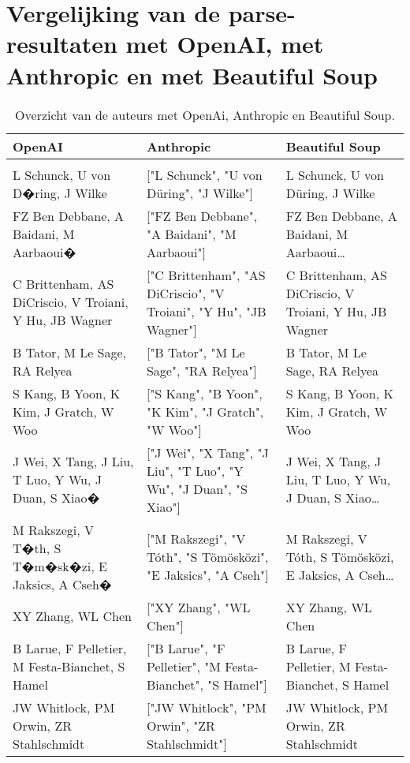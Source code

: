 \section{Vergelijking van de parse-resultaten met OpenAI, met Anthropic en met Beautiful Soup}
\begin{table}[h!]
    \tiny
    \caption{Overzicht van de auteurs met OpenAi, Anthropic en Beautiful Soup.}
    \centering
    \begin{adjustbox}{width=1.2\textwidth,center}
    \begin{tabularx}{\linewidth}{|X|X|X|} 
        \hline
        \rowcolor{lightgray}
        OpenAI & Anthropic & Beautiful Soup\\ 
        \hline
        \rowcolor{lightgray}
        \multicolumn{3}{|X|}{Auteurs}\\ 
        \hline
        L Schunck, U von D�ring, J Wilke & ["L Schunck", "U von Düring", "J Wilke"] & L Schunck, U von Düring, J Wilke\\ 
        FZ Ben Debbane, A Baidani, M Aarbaoui� & ["FZ Ben Debbane", "A Baidani", "M Aarbaoui"] & FZ Ben Debbane, A Baidani, M Aarbaoui…\\
        C Brittenham, AS DiCriscio, V Troiani, Y Hu, JB Wagner & ["C Brittenham", "AS DiCriscio", "V Troiani", "Y Hu", "JB Wagner"] & C Brittenham, AS DiCriscio, V Troiani, Y Hu, JB Wagner\\
        B Tator, M Le Sage, RA Relyea & ["B Tator", "M Le Sage", "RA Relyea"] & B Tator, M Le Sage, RA Relyea\\
        S Kang, B Yoon, K Kim, J Gratch, W Woo & ["S Kang", "B Yoon", "K Kim", "J Gratch", "W Woo"] & S Kang, B Yoon, K Kim, J Gratch, W Woo\\
        J Wei, X Tang, J Liu, T Luo, Y Wu, J Duan, S Xiao� & ["J Wei", "X Tang", "J Liu", "T Luo", "Y Wu", "J Duan", "S Xiao"] & J Wei, X Tang, J Liu, T Luo, Y Wu, J Duan, S Xiao…\\
        M Rakszegi, V T�th, S T�m�sk�zi, E Jaksics, A Cseh� & ["M Rakszegi", "V Tóth", "S Tömösközi", "E Jaksics", "A Cseh"] & M Rakszegi, V Tóth, S Tömösközi, E Jaksics, A Cseh…\\
        XY Zhang, WL Chen & ["XY Zhang", "WL Chen"] & XY Zhang, WL Chen\\
        B Larue, F Pelletier, M Festa-Bianchet, S Hamel & ["B Larue", "F Pelletier", "M Festa-Bianchet", "S Hamel"] & B Larue, F Pelletier, M Festa-Bianchet, S Hamel\\
        JW Whitlock, PM Orwin, ZR Stahlschmidt & ["JW Whitlock", "PM Orwin", "ZR Stahlschmidt"] & JW Whitlock, PM Orwin, ZR Stahlschmidt\\
        \hline
    \end{tabularx}
    \end{adjustbox}
    \label{table:llmAuteur}
\end{table}
